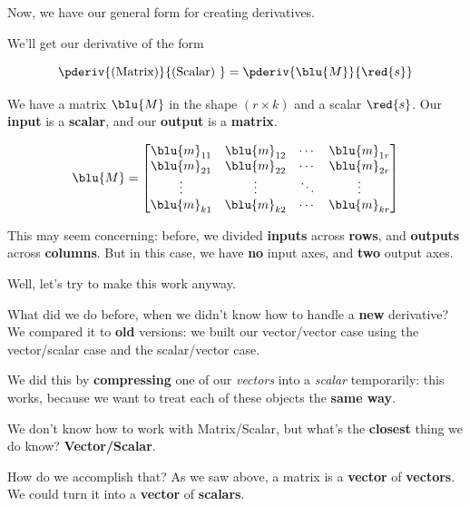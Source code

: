         Now, we have our general form for creating derivatives.
        
        We'll get our derivative of the form 
        
        \begin{equation}
            \pderiv{ \text{(Matrix)} } { \text{(Scalar) } }
            =
            \pderiv{ \blu{M} }{ \red{s} } 
        \end{equation}
        
        We have a matrix $\blu{M}$ in the shape $(r \times k)$ and a scalar $\red{s}$. Our \textbf{input} is a \textbf{scalar}, and our \textbf{output} is a \textbf{matrix}.
        
        \begin{equation}
            \blu{M}
            =
            \begin{bmatrix}
                \blu{m}_{11} & \blu{m}_{12} & \cdots & \blu{m}_{1r} \\ 
                \blu{m}_{21} & \blu{m}_{22} & \cdots & \blu{m}_{2r} \\ 
                \vdots       & \vdots       & \ddots & \vdots     \\
                \blu{m}_{k1} & \blu{m}_{k2} & \cdots & \blu{m}_{kr} \\ 
            \end{bmatrix}
        \end{equation}
        
        This may seem concerning: before, we divided \textbf{inputs} across \textbf{rows}, and \textbf{outputs} across \textbf{columns}. But in this case, we have \textbf{no} input axes, and \textbf{two} output axes. 
        
        Well, let's try to make this work anyway. 
        
        What did we do before, when we didn't know how to handle a \textbf{new} derivative? We compared it to \textbf{old} versions: we built our vector/vector case using the vector/scalar case and the scalar/vector case.
        
        We did this by \textbf{compressing} one of our \textit{vectors} into a \textit{scalar} temporarily: this works, because we want to treat each of these objects the \textbf{same way}.
        
        We don't know how to work with Matrix/Scalar, but what's the \textbf{closest} thing we do know? \textbf{Vector/Scalar}.
        
        How do we accomplish that? As we saw above, a matrix is a \textbf{vector} of \textbf{vectors}. We could turn it into a \textbf{vector} of \textbf{scalars}.\\
        
